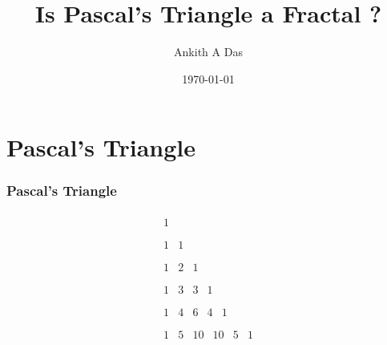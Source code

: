 \documentclass{beamer}
\title{Is Pascal's Triangle a Fractal ?}
\author{Ankith A Das}
\institute{The University of Sydney}
\date{\today}
\begin{document}
\frame{\titlepage}


\section[Outline]{}

\section{Pascal's Triangle}
\begin{frame}
    \frametitle{Pascal's Triangle}
    \begin{equation*}
        \begin{array}{c}
            \begin{array}{c}
             1 \\
            \end{array}
             \\
            \begin{array}{cc}
             1 & 1 \\
            \end{array}
             \\
            \begin{array}{ccc}
             1 & 2 & 1 \\
            \end{array}
             \\
            \begin{array}{cccc}
             1 & 3 & 3 & 1 \\
            \end{array}
             \\
            \begin{array}{ccccc}
             1 & 4 & 6 & 4 & 1 \\
            \end{array}
             \\
            \begin{array}{cccccc}
             1 & 5 & 10 & 10 & 5 & 1 \\
            \end{array}
             \\

\end{array}
\end{equation*}
\end{frame}
\end{document}
